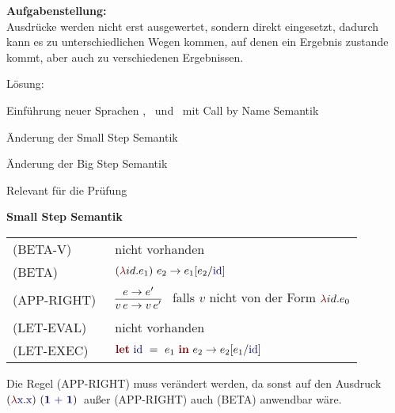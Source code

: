 {
  \textbf{Aufgabenstellung:}\\[2mm]
  Ausdrücke werden nicht erst ausgewertet, sondern direkt eingesetzt,
  dadurch kann es zu unterschiedlichen Wegen kommen, auf denen ein Ergebnis
  zustande kommt, aber auch zu verschiedenen Ergebnissen.

  {
    \begin{itemgroup}{Lösung:}
      \item Einführung neuer Sprachen \LZEROCBN, \LONECBN\ und \LTWOCBN\ mit Call by Name Semantik
      \item Änderung der Small Step Semantik
      \item Änderung der Big Step Semantik
      \item Relevant für die Prüfung \glqq \TPONE \grqq
    \end{itemgroup}
  }
}


{
  {\bf Small Step Semantik}\\[5mm]
  \begin{tabular}{ll}
     \mbox{(BETA-V)}      & nicht vorhanden \\[3mm]
     \mbox{(BETA)}        & $\ExprApplication{\Parenthesis{\ExprLambda{id}{}{e_1}}}{e_2} \to
                                               e_1[e_2/\ExprIdentifier{id}]$ \\[3mm]
     \mbox{(APP-RIGHT)\ } & $\smallsteprule{e \to e'}
                              {v\,e \to v\,e'}$ \ 
                              falls ${v}$ nicht von der Form $\ExprLambda{id}{}{e_0}$ \\[5mm]
     \mbox{(LET-EVAL)\  } & nicht vorhanden \\[3mm]
     \mbox{(LET-EXEC)}    & $\ExprLet{\ExprIdentifier{id}}{}{e_1}{e_2} \to
                                      e_2[e_1/\ExprIdentifier{id}]$ \\[3mm]
  \end{tabular}

  Die Regel (APP-RIGHT) muss verändert werden, da sonst auf den Ausdruck \glqq
  $\ExprApplication{\Parenthesis{\ExprLambda{\ExprIdentifier{x}}{}{\ExprIdentifier{x}}}}
  {\Parenthesis{\ExprInfixOperation{\ExprBinaryOperator{+}}{\ExprConstant{1}}{\ExprConstant{1}}}}$\grqq\ 
  außer (APP-RIGHT) auch (BETA) anwendbar wäre.
}


